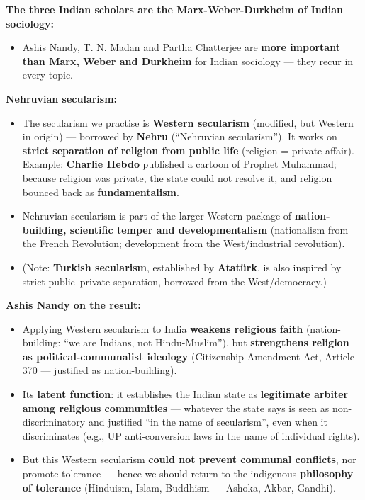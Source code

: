 \begin{CriticalPoint}
\textbf{The three Indian scholars are the Marx-Weber-Durkheim of Indian sociology:}
\begin{itemize}
\item Ashis Nandy, T. N. Madan and Partha Chatterjee are \textbf{more important than Marx, Weber and Durkheim} for Indian sociology --- they recur in every topic.
\end{itemize}
\end{CriticalPoint}

\begin{DataFact}
\textbf{Nehruvian secularism:}
\begin{itemize}
\item The secularism we practise is \textbf{Western secularism} (modified, but Western in origin) --- borrowed by \textbf{Nehru} (``Nehruvian secularism''). It works on \textbf{strict separation of religion from public life} (religion = private affair). Example: \textbf{Charlie Hebdo} published a cartoon of Prophet Muhammad; because religion was private, the state could not resolve it, and religion bounced back as \textbf{fundamentalism}.
\item Nehruvian secularism is part of the larger Western package of \textbf{nation-building, scientific temper and developmentalism} (nationalism from the French Revolution; development from the West/industrial revolution).
\item (Note: \textbf{Turkish secularism}, established by \textbf{Atat\"urk}, is also inspired by strict public--private separation, borrowed from the West/democracy.)
\end{itemize}
\end{DataFact}

\begin{CriticalPoint}
\textbf{Ashis Nandy on the result:}
\begin{itemize}
\item Applying Western secularism to India \textbf{weakens religious faith} (nation-building: ``we are Indians, not Hindu-Muslim''), but \textbf{strengthens religion as political-communalist ideology} (Citizenship Amendment Act, Article 370 --- justified as nation-building).
\item Its \textbf{latent function}: it establishes the Indian state as \textbf{legitimate arbiter among religious communities} --- whatever the state says is seen as non-discriminatory and justified ``in the name of secularism'', even when it discriminates (e.g., UP anti-conversion laws in the name of individual rights).
\item But this Western secularism \textbf{could not prevent communal conflicts}, nor promote tolerance --- hence we should return to the indigenous \textbf{philosophy of tolerance} (Hinduism, Islam, Buddhism --- Ashoka, Akbar, Gandhi).
\end{itemize}
\end{CriticalPoint}

